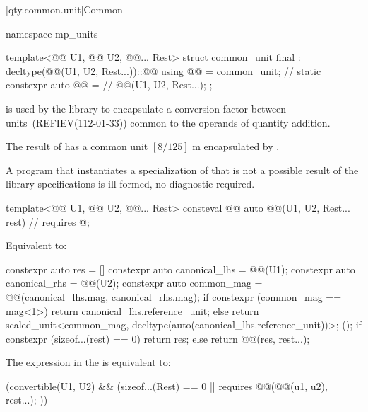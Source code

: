 [qty.common.unit]{Common}

\begin{codeblock}
namespace mp_units {

template<@@ U1, @@ U2, @@... Rest>
struct common_unit final : decltype(@@(U1{}, U2{}, Rest{}...))::@@
{
  using @@ = common_unit;       // \expos
  static constexpr auto @@ =  // \expos
    @@(U1{}, U2{}, Rest{}...);
};

}
\end{codeblock}

\pnum
{} is used by the library
to encapsulate a conversion factor between units~(REFIEV(112-01-33))
common to the operands of quantity addition.
\begin{example}
The result of 
has a common unit $[8/125] \textrm{ m}$
encapsulated by .
\end{example}
A program that instantiates a specialization of 
that is not a possible result of the library specifications
is ill-formed, no diagnostic required.

\begin{itemdecl}
template<@@ U1, @@ U2, @@... Rest>
consteval @@ auto @@(U1, U2, Rest... rest)  // \expos
  requires @\seebelownc@;
\end{itemdecl}

\begin{itemdescr}
\pnum
\effects
Equivalent to:
\begin{codeblock}
constexpr auto res = [] {
  constexpr auto canonical_lhs = @@(U1{});
  constexpr auto canonical_rhs = @@(U2{});
  constexpr auto common_mag = @@(canonical_lhs.mag, canonical_rhs.mag);
  if constexpr (common_mag == mag<1>)
    return canonical_lhs.reference_unit;
  else
    return scaled_unit<common_mag, decltype(auto(canonical_lhs.reference_unit))>{};
}();
if constexpr (sizeof...(rest) == 0)
  return res;
else
  return @@(res, rest...);
\end{codeblock}

\pnum
\remarks
The expression in the  is equivalent to:
\begin{codeblock}
(convertible(U1{}, U2{}) && (sizeof...(Rest) == 0 || requires {
   @@(@@(u1, u2), rest...);
 }))
\end{codeblock}
\end{itemdescr}

